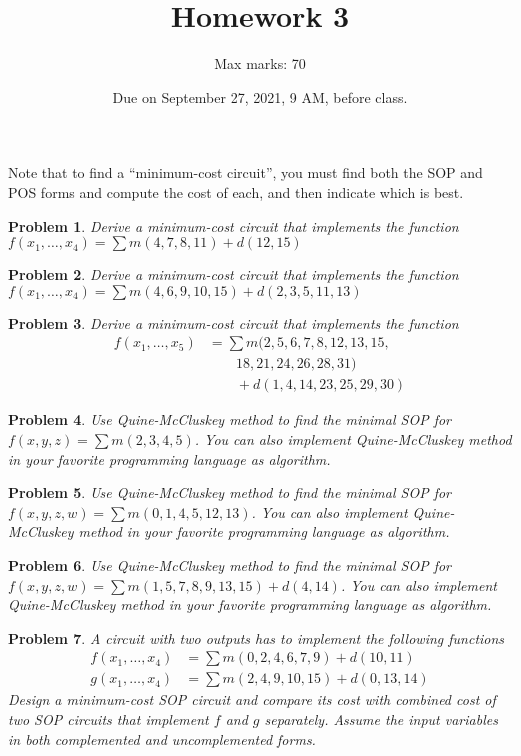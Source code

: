 \documentclass[twocolumn]{article}
\title{Homework 3}
\author{Max marks: 70}
\date{Due on September 27, 2021, 9 AM, before class.}
\newtheorem{prob}{Problem}
\begin{document}
\maketitle
Note that to find a ``minimum-cost circuit'', you must find both the SOP and POS
forms and compute the cost of each, and then indicate which is best.

\begin{prob}
  Derive a minimum-cost circuit that implements the function
  $f(x_1, \dots, x_4) = \sum m(4, 7, 8, 11) + d(12, 15)$
\end{prob}

\begin{prob}
  Derive a minimum-cost circuit that implements the function
  $f(x_1, \dots, x_4) = \sum m(4, 6, 9, 10, 15) + d(2, 3, 5, 11, 13)$
\end{prob}

\begin{prob}
  Derive a minimum-cost circuit that implements the function
  \begin{align*}
    f(x_1, \dots, x_5) &= \sum m(2, 5, 6, 7, 8, 12, 13, 15, \\
    &\qquad 18, 21, 24, 26, 28,
      31)
      \\
      &\qquad + d(1, 4, 14, 23, 25, 29, 30)
  \end{align*}
\end{prob}

\begin{prob}
  Use Quine-McCluskey method to find the minimal SOP for $f(x, y, z) = \sum m(2,
  3, 4, 5)$.
  You can also implement Quine-McCluskey method in your favorite programming
  language as algorithm.
\end{prob}

\begin{prob}
  Use Quine-McCluskey method to find the minimal SOP for $f(x, y, z, w) = \sum
  m(0, 1, 4, 5, 12, 13)$.
  You can also implement Quine-McCluskey method in your favorite programming
  language as algorithm.
\end{prob}

\begin{prob}
  Use Quine-McCluskey method to find the minimal SOP for $f(x, y, z, w) = \sum
  m(1, 5, 7, 8, 9, 13, 15) + d(4, 14)$.
  You can also implement Quine-McCluskey method in your favorite programming
  language as algorithm.
\end{prob}

\begin{prob}
  A circuit with two outputs has to implement the following functions
  \begin{align}
    f(x_1, \dots, x_4) &= \sum m(0, 2, 4, 6, 7, 9) + d(10, 11)
    \\
    g(x_1, \dots, x_4) &= \sum m(2, 4, 9, 10, 15) + d(0, 13, 14)
  \end{align}
  Design a minimum-cost SOP circuit and compare its cost with combined cost of
  two SOP circuits that implement $f$ and $g$ separately. Assume the input
  variables in both complemented and uncomplemented forms. 
\end{prob}


%
%
\end{document}
